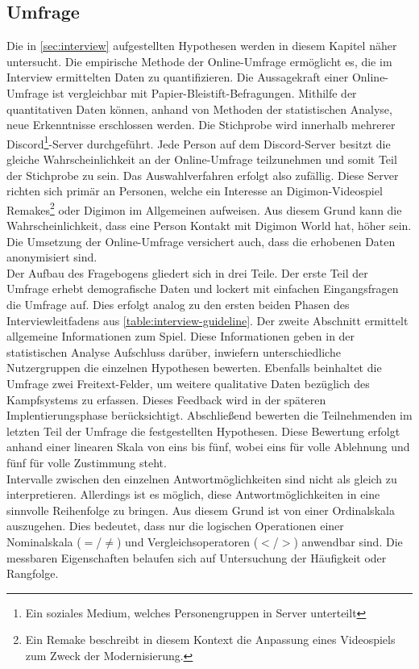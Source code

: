 \subsection{Umfrage}\label{sec:survey}
Die in \autoref{sec:interview} aufgestellten Hypothesen werden in diesem Kapitel näher untersucht. Die empirische Methode der Online-Umfrage\cite{value-online-survey} ermöglicht es, die im Interview ermittelten Daten zu quantifizieren. Die Aussagekraft einer Online-Umfrage ist vergleichbar mit Papier-Bleistift-Befragungen\cite{online-marktforschung}. Mithilfe der quantitativen Daten können, anhand von Methoden der statistischen Analyse, neue Erkenntnisse erschlossen werden.
Die Stichprobe wird innerhalb mehrerer Discord\footnote{Ein soziales Medium, welches Personengruppen in Server unterteilt\cite{discord}}-Server durchgeführt. Jede Person auf dem Discord-Server besitzt die gleiche Wahrscheinlichkeit an der Online-Umfrage teilzunehmen und somit Teil der Stichprobe zu sein. Das Auswahlverfahren erfolgt also zufällig. Diese Server richten sich primär an Personen, welche ein Interesse an Digimon-Videospiel Remakes\footnote{Ein Remake beschreibt in diesem Kontext die Anpassung eines Videospiels zum Zweck der Modernisierung.} oder Digimon im Allgemeinen aufweisen. Aus diesem Grund kann die Wahrscheinlichkeit, dass eine Person Kontakt mit Digimon World hat, höher sein. Die Umsetzung der Online-Umfrage versichert auch, dass die erhobenen Daten anonymisiert sind.\\

Der Aufbau des Fragebogens gliedert sich in drei Teile. Der erste Teil der Umfrage erhebt demografische Daten und lockert mit einfachen Eingangsfragen die Umfrage auf. Dies erfolgt analog zu den ersten beiden Phasen des Interviewleitfadens aus \autoref{table:interview-guideline}. Der zweite Abschnitt ermittelt allgemeine Informationen zum Spiel. Diese Informationen geben in der statistischen Analyse Aufschluss darüber, inwiefern unterschiedliche Nutzergruppen die einzelnen Hypothesen bewerten. Ebenfalls beinhaltet die Umfrage zwei Freitext-Felder, um weitere qualitative Daten bezüglich des Kampfsystems zu erfassen. Dieses Feedback wird in der späteren Implentierungsphase berücksichtigt. Abschließend bewerten die Teilnehmenden im letzten Teil der Umfrage die festgestellten Hypothesen. Diese Bewertung erfolgt anhand einer linearen Skala von eins bis fünf, wobei eins für volle Ablehnung und fünf für volle Zustimmung steht.  \\

Intervalle zwischen den einzelnen Antwortmöglichkeiten sind nicht als gleich zu interpretieren. Allerdings ist es möglich, diese Antwortmöglichkeiten in eine sinnvolle Reihenfolge zu bringen. Aus diesem Grund ist von einer Ordinalskala auszugehen\cite[S.11]{elementare-stochastik}. Dies bedeutet, dass nur die logischen Operationen einer Nominalskala ($=$/$\neq$) und Vergleichsoperatoren ($<$/$>$) anwendbar sind. Die messbaren Eigenschaften belaufen sich auf Untersuchung der Häufigkeit oder Rangfolge.\\

